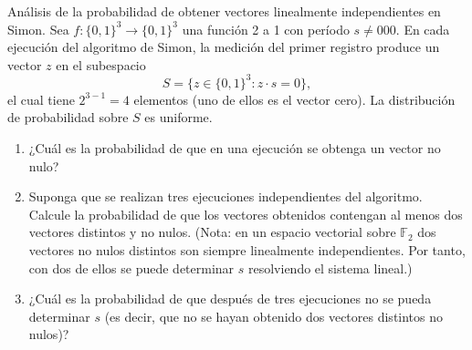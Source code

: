 {\bfseries

Análisis de la probabilidad de obtener vectores linealmente independientes en Simon. Sea $f:\{0,1\}^3 \rightarrow \{0,1\}^3$ una función 2 a 1 con período $s \neq 000$. En cada ejecución del algoritmo de Simon, la medición del primer registro produce un vector $z$ en el subespacio
$$S = \{z \in \{0,1\}^3 : z \cdot s = 0\},$$
el cual tiene $2^{3-1}=4$ elementos (uno de ellos es el vector cero). La distribución de probabilidad sobre $S$ es uniforme.
\begin{enumerate}
    \item[a)] ¿Cuál es la probabilidad de que en una ejecución se obtenga un vector no nulo?
    \item[b)] Suponga que se realizan tres ejecuciones independientes del algoritmo. Calcule la probabilidad de que los vectores obtenidos contengan al menos dos vectores distintos y no nulos. (Nota: en un espacio vectorial sobre $\mathbb{F}_2$ dos vectores no nulos distintos son siempre linealmente independientes. Por tanto, con dos de ellos se puede determinar $s$ resolviendo el sistema lineal.)
    \item[c)] ¿Cuál es la probabilidad de que después de tres ejecuciones no se pueda determinar $s$ (es decir, que no se hayan obtenido dos vectores distintos no nulos)?
\end{enumerate}}

\vspace{.5cm}


